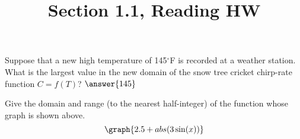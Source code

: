 \documentclass{ximera}
\title{Section 1.1, Reading HW}
\begin{document}
\begin{abstract}
\end{abstract}
\maketitle

\begin{problem}
Suppose that a new high temperature of 145\(^\circ\)F is recorded at a weather station.  What is the largest value in the new domain of the snow tree cricket chirp-rate function \(C=f(T)\)?
    $\answer{145}$

\end{problem}

\begin{problem}
   Give the domain and range (to the nearest half-integer) of the function whose graph is shown above.
   \[
    \graph{2.5+abs(3\sin(x))}
   \]
   
\end{problem}
\end{document}
